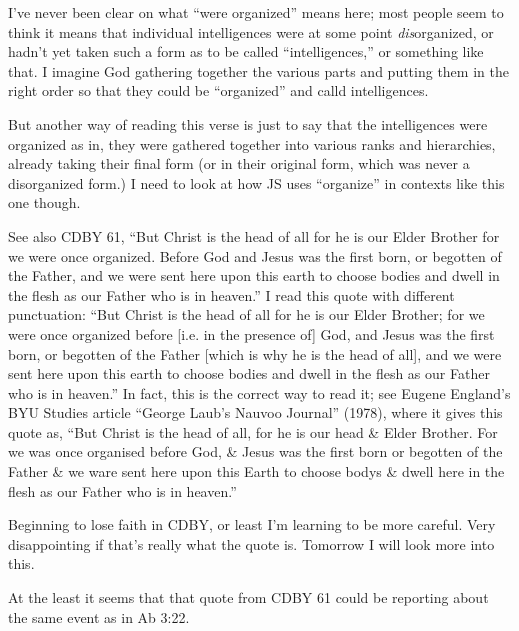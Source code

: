 		\begin{compactdesc}
		
		\item[22$\vert$]
		\begin{compactdesc}
		\item[the intelligences that were organized before the world was] I've never been clear on what ``were organized'' means here; most people seem to think it means that individual intelligences were at some point \textit{dis}organized, or hadn't yet taken such a form as to be called ``intelligences,'' or something like that. I imagine God gathering together the various parts and putting them in the right order so that they could be ``organized'' and calld intelligences. 
		
		But another way of reading this verse is just to say that the intelligences were organized as in, they were gathered together into various ranks and hierarchies, already taking their final form (or in their original form, which was never a disorganized form.) I need to look at how JS uses ``organize'' in contexts like this one though.
		
		See also CDBY 61, ``But Christ is the head of all for he is our Elder Brother for we were once organized. Before God and Jesus was the first born, or begotten of the Father, and we were sent here upon this earth to choose bodies and dwell in the flesh as our Father who is in heaven.'' I read this quote with different punctuation: ``But Christ is the head of all for he is our Elder Brother; for we were once organized before [i.e. in the presence of] God, and Jesus was the first born, or begotten of the Father [which is why he is the head of all], and we were sent here upon this earth to choose bodies and dwell in the flesh as our Father who is in heaven.'' In fact, this is the correct way to read it; see Eugene England's BYU Studies article ``George Laub's Nauvoo Journal'' (1978), where it gives this quote as, ``But Christ is the head of all, for he is our head \& Elder Brother. For we was once organised before God, \& Jesus was the first born or begotten of the Father \& we ware sent here upon this Earth to choose bodys \& dwell here in the flesh as our Father who is in heaven.''
		
		Beginning to lose faith in CDBY, or least I'm learning to be more careful. Very disappointing if that's really what the quote is. Tomorrow I will look more into this.
		
		At the least it seems that that quote from CDBY 61 could be reporting about the same event as in Ab 3:22. 
		\end{compactdesc}
		
		\end{compactdesc}
		
